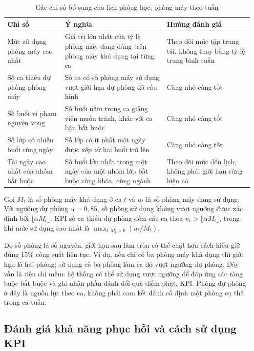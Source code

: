 \begin{table}[htbp]
    \centering
    \caption{Các chỉ số bổ sung cho lịch phòng học, phòng máy theo tuần}
    \label{tab:kpi-lich-tuan}
    \small
    \begin{tabularx}{\textwidth}{@{}p{}XX@{}}
        \toprule
        Chỉ số & Ý nghĩa & Hướng đánh giá \\
        \midrule
        Mức sử dụng phòng máy cao nhất & Giá trị lớn nhất của tỷ lệ phòng máy đang dùng trên phòng máy khả dụng tại từng ca & Theo dõi mức tập trung tải, không thay bằng tỷ lệ trung bình tuần \\
        \addlinespace
        Số ca thiếu dự phòng phòng máy & Số ca có số phòng máy sử dụng vượt giới hạn dự phòng đã cấu hình & Càng nhỏ càng tốt \\
        \addlinespace
        Số buổi vi phạm nguyện vọng & Số buổi nằm trong ca giảng viên muốn tránh, khác với ca bận bắt buộc & Càng nhỏ càng tốt \\
        \addlinespace
        Số lớp có nhiều buổi cùng ngày & Số lớp có ít nhất một ngày được xếp từ hai buổi trở lên & Càng nhỏ càng tốt \\
        \addlinespace
        Tải ngày cao nhất của nhóm bắt buộc & Số buổi lớn nhất trong một ngày của một nhóm lớp bắt buộc cùng khóa, cùng ngành & Theo dõi mức dồn lịch; không phải giới hạn cứng hiện có \\
        \bottomrule
    \end{tabularx}
\end{table}

Gọi $M_t$ là số phòng máy khả dụng ở ca $t$ và $u_t$ là số phòng máy đang sử dụng. Với ngưỡng dự phòng $\alpha=0{,}85$, số phòng sử dụng không vượt ngưỡng được xác định bởi $\lfloor\alpha M_t\rfloor$. KPI số ca thiếu dự phòng đếm các ca thỏa $u_t>\lfloor\alpha M_t\rfloor$, trong khi mức sử dụng cao nhất là $\max_{t:M_t>0}(u_t/M_t)$.

Do số phòng là số nguyên, giới hạn sau làm tròn có thể chặt hơn cách hiểu giữ đúng 15\% công suất liên tục. Ví dụ, nếu chỉ có ba phòng máy khả dụng thì giới hạn là hai phòng; sử dụng cả ba phòng làm ca đó vượt ngưỡng dự phòng. Đây vẫn là tiêu chí mềm: hệ thống có thể sử dụng vượt ngưỡng để đáp ứng các ràng buộc bắt buộc và ghi nhận phần đánh đổi qua điểm phạt, KPI. Phòng dự phòng ở đây là nguồn lực theo ca, không phải cam kết dành cố định một phòng cụ thể trong cả tuần.

\subsection{Đánh giá khả năng phục hồi và cách sử dụng KPI}

